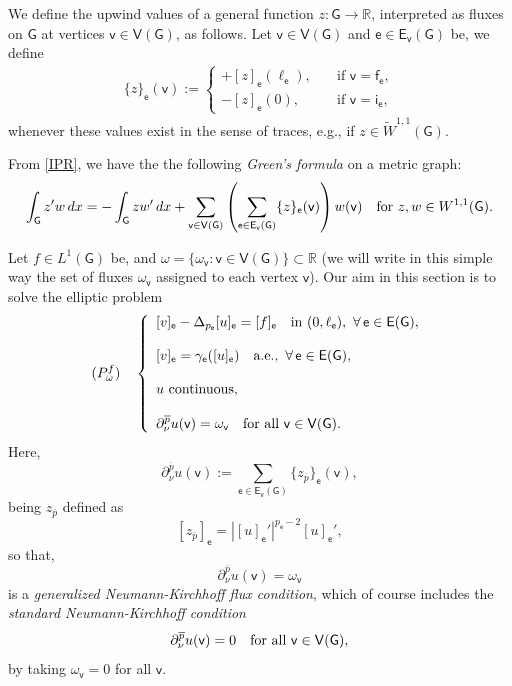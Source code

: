 \documentclass[reqno,12pt]{amsart}
\def\R{\mathbb R} %
\def\e{\mathsf{e}} 	%
\def\v{\mathsf{v}}	%
\newcommand{\vi}{\mathsf{i}} %
\newcommand{\vf}{\mathsf{f}} %
\newcommand{\G}{\mathsf{G}}	%
\newcommand{\V}{\mathsf{V}}	%
\newcommand{\E}{\mathsf{E}}	%
\numberwithin{equation}{section} %
\begin{document}
 We   define the upwind values of a general function $z:\G\to\R$, interpreted as fluxes on $\G$ at vertices $\v\in\V(\G)$, as follows. Let   $\v\in\V(\G)$ and $\e\in\E_\v(\G)$ be, we define
\begin{align}\label{eq:upwind_values}
\{z\}_\e(\v) :=
\begin{cases}
+[z]_\e(\ell_\e),\quad&\text{if }\v=\vf_\e,\\
-[z]_\e(0),\quad&\text{if }\v=\vi_\e,
\end{cases}
\end{align}
whenever these values exist in the sense of traces, e.g.,  if $z\in \widetilde W^{1,1}(\G)$. 

   From \eqref{IPR}, we have the the following {\it Green's formula} on a metric graph: 
\begin{equation}\label{GREENF0}
  \int_{\G}z' w\, dx  = -\int_{\G}z w'\, dx+ \sum_{\v\in \V(\G)} \left(\sum_{\e \in\E_{\v}(\G)} 
  \{z\}_\e(\v)\right)w(\v)\quad\hbox{for }  z,w\in W^{1,1}(\G).
\end{equation}   
   

  Let  $  f\in L^{1}(\G)$ be,  and $ \omega=\{ \omega_\v: \v \in \V(\G) \} \subset \R$ (we will write in this simple way the set of fluxes $\omega_\v$ assigned to each vertex $\v$). Our   aim in this section is to solve the elliptic problem
\begin{equation}\label{24111058} 
 (P_{\omega}^f)\quad\left\{\begin{array}{l}
[v]_\e-\Delta_{p_\e} [u]_\e=[f]_\e\quad\hbox{in } (0,\ell_\e),\ \forall\, \e\in \E(\G),\\
\\{}
[v]_\e=\gamma_\e([u]_\e)\quad\hbox{a.e.},\ \forall\, \e\in \E(\G),
\\ \\ 
\hbox{$u$ continuous,}
\\ \\
\displaystyle \partial^{\overline{p}}_\nu u(\v)= {\omega_\v}   \quad\hbox{for all } \v\in \V(\G).
\end{array}\right.
\end{equation}
Here,  
 \begin{equation}\label{GREENF0op} \partial^{\overline{p}}_\nu u(\v):=\displaystyle\sum_{\e \in\E_{\v}(\G)} 
  \{z_{\overline{p}} \}_\e(\v), 
  \end{equation}
 being $z_{\overline{p}}$ defined as  
 $$[z_{\overline{p}}]_\e=  |[u]_\e'|^{p_\e-2}[u]_\e',$$
so that,   
$$\partial^{\overline{p}}_\nu u(\v)= {\omega_\v}$$  is a {\it generalized Neumann-Kirchhoff flux condition},
which of course includes the {\it standard
  Neumann-Kirchhoff condition}
 $$\partial^{\overline{p}}_\nu u(\v)
 =0 \quad\hbox{for all } \v\in \V(\G),$$
 by taking  $\omega_\v=0$ for all $\v$.
\end{document}

